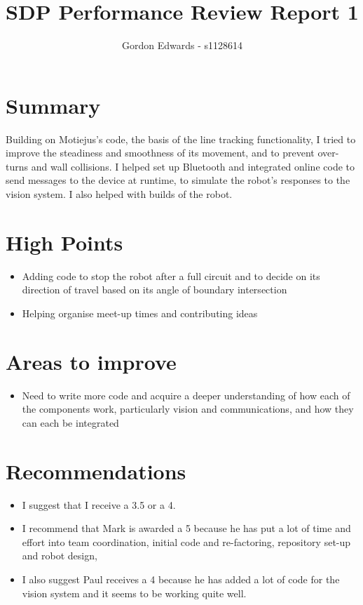 \documentclass[12pt]{article}
\begin{document}
\author{Gordon Edwards - s1128614}
\title{SDP Performance Review Report 1}
\maketitle 

\section{Summary}
Building on Motiejus's code, the basis of the line tracking functionality, I tried to improve the steadiness and smoothness of its movement, and to prevent over-turns and wall collisions. I helped set up Bluetooth and integrated online code to send messages to the device at runtime, to simulate the robot's responses to the vision system. I also helped with builds of the robot.
\section{High Points}
\begin{itemize}
	\item Adding code to stop the robot after a full circuit and to decide on its direction of travel based on its angle of boundary intersection
	\item Helping organise meet-up times and contributing ideas
\end{itemize}
\section{Areas to improve}
\begin{itemize}
	\item Need to write more code and acquire a deeper understanding of how each of the components work, particularly vision and communications, and how they can each be integrated
\end{itemize}
\section{Recommendations}
\begin{itemize}
	\item I suggest that I receive a 3.5 or a 4. 
	\item I recommend that Mark is awarded a 5 because he has put a lot of time and effort into team coordination, initial code and re-factoring, repository set-up and robot design, 
	\item I also suggest Paul receives a 4 because he has added a lot of code for the vision system and it seems to be working quite well.
\end{itemize}	
\end{document}
